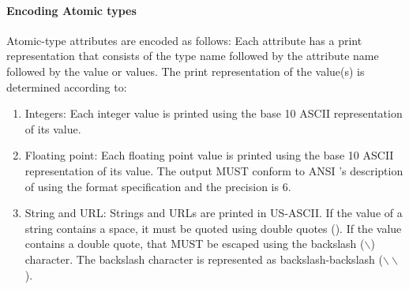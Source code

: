 \documentclass[justify]{nasa-ese}
\begin{document}



\paragraph{Encoding Atomic types} Atomic-type attributes are encoded as
follows: Each attribute has a print representation that consists of the type
name followed by the attribute name followed by the value or values. The
print representation of the value(s) is determined according to:

\begin{enumerate}
\item Integers: Each integer value is printed using the base 10 ASCII
  representation of its value.
\item Floating point: Each floating point value is printed using the base 10
  ASCII representation of its value. The output MUST conform to ANSI \C's
  description of  using the  format specification and
  the precision is 6.
\item String and URL: Strings and URLs are printed in US-ASCII. If the value
  of a string contains a space, it must be quoted using double quotes
  (). If the value contains a double quote, that MUST be escaped using
  the backslash ($\backslash$) character. The backslash character is
  represented as backslash-backslash ($\backslash\backslash$).
\end{enumerate}
\end{document}
